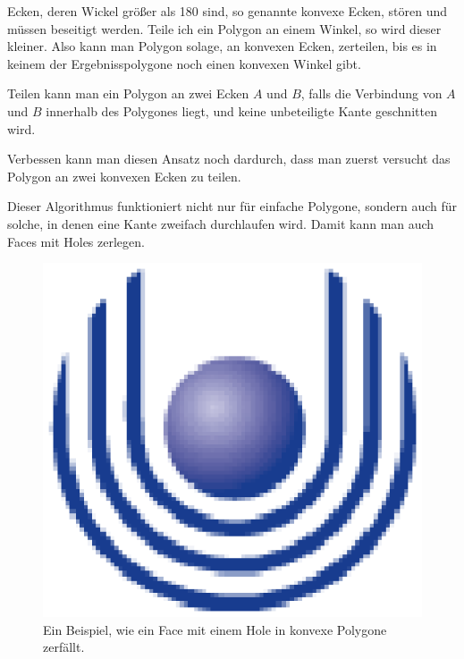 Ecken, deren Wickel größer als 180\degree\/ sind, so genannte konvexe Ecken, stören und müssen beseitigt werden. Teile ich ein Polygon an einem Winkel, so wird dieser kleiner. Also kann man Polygon solage, an konvexen Ecken,  zerteilen, bis es in keinem der Ergebnisspolygone noch einen konvexen Winkel gibt.

Teilen kann man ein Polygon an zwei Ecken $A$ und $B$, falls die Verbindung von $A$ und $B$ innerhalb des Polygones liegt, und keine unbeteiligte Kante geschnitten wird.

Verbessen kann man diesen Ansatz noch dardurch, dass man zuerst versucht das Polygon an zwei konvexen Ecken zu teilen.

Dieser Algorithmus funktioniert nicht nur für einfache Polygone, sondern auch für solche, in denen eine Kante zweifach durchlaufen wird. Damit kann man auch Faces mit Holes zerlegen.

\begin{figure}
	\centering
	\includegraphics{feu_logo2.eps}
	\caption{Ein Beispiel, wie ein Face mit einem Hole in konvexe Polygone zerfällt.}
	\label{fig:ZerlegungFace}
\end{figure}



